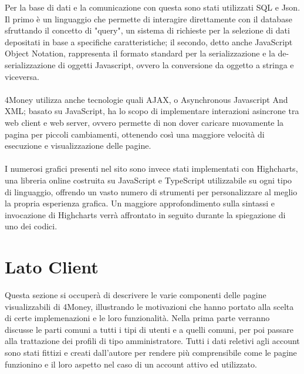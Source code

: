 \documentclass[binding=0.6cm, oneside, noexaminfo, italian]{sapthesis}
\begin{document}
Per la base di dati e la comunicazione con questa sono stati utilizzati SQL e Json. Il primo è un linguaggio che permette di interagire direttamente con il database sfruttando il concetto di "query", un sistema di richieste per la selezione di dati depositati in base a specifiche caratteristiche; il secondo, detto anche JavaScript Object Notation, rappresenta il formato standard per la serializzazione e la de-serializzazione di oggetti Javascript, ovvero la conversione da oggetto a stringa e viceversa. \\ \\
4Money utilizza anche tecnologie quali AJAX, o Asynchronous Javascript And XML; basato su JavaScript, ha lo scopo di implementare interazioni asincrone tra web client e web server, ovvero permette di non dover caricare nuovamente la pagina per piccoli cambiamenti, ottenendo così una maggiore velocità di esecuzione e visualizzazione delle pagine. \\ \\
I numerosi grafici presenti nel sito sono invece stati implementati con Highcharts, una libreria online costruita su JavaScript e TypeScript utilizzabile su ogni tipo di linguaggio, offrendo un vasto numero di strumenti per personalizzare al meglio la propria esperienza grafica. Un maggiore approfondimento sulla sintassi e invocazione di Highcharts verrà affrontato in seguito durante la spiegazione di uno dei codici.

\newpage
\section{Lato Client}
Questa sezione si occuperà di descrivere le varie componenti delle pagine visualizzabili di 4Money, illustrando le motivazioni che hanno portato alla scelta di certe implemenazioni e le loro funzionalità. Nella prima parte verranno discusse le parti comuni a tutti i tipi di utenti e a quelli comuni, per poi passare alla trattazione dei profili di tipo amministratore. Tutti i dati reletivi agli account sono stati fittizi e creati dall'autore per rendere più comprensibile come le pagine funzionino e il loro aspetto nel caso di un account attivo ed utilizzato.
\end{document}
